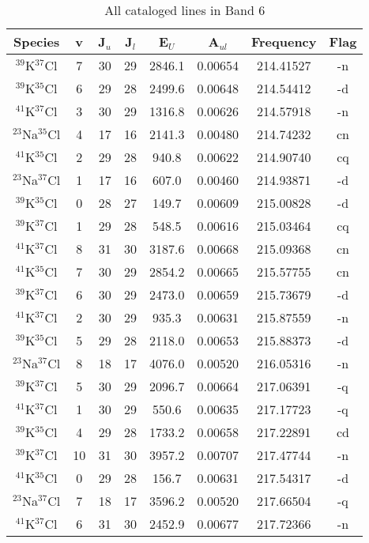 \begin{table*}[htp]
\centering
\caption{All cataloged lines in Band 6}
\begin{tabular}{cccccccc}
\label{tab:all_detections_B6}
Species & v & J$_u$ & J$_l$ & E$_U$ & A$_{ul}$ & Frequency & Flag \\
\hline
$^{39}$K$^{37}$Cl & 7 & 30 & 29 & 2846.1 & 0.00654 & 214.41527 & -n \\
$^{39}$K$^{35}$Cl & 6 & 29 & 28 & 2499.6 & 0.00648 & 214.54412 & -d \\
$^{41}$K$^{37}$Cl & 3 & 30 & 29 & 1316.8 & 0.00626 & 214.57918 & -n \\
$^{23}$Na$^{35}$Cl & 4 & 17 & 16 & 2141.3 & 0.00480 & 214.74232 & cn \\
$^{41}$K$^{35}$Cl & 2 & 29 & 28 & 940.8 & 0.00622 & 214.90740 & cq \\
$^{23}$Na$^{37}$Cl & 1 & 17 & 16 & 607.0 & 0.00460 & 214.93871 & -d \\
$^{39}$K$^{35}$Cl & 0 & 28 & 27 & 149.7 & 0.00609 & 215.00828 & -d \\
$^{39}$K$^{37}$Cl & 1 & 29 & 28 & 548.5 & 0.00616 & 215.03464 & cq \\
$^{41}$K$^{37}$Cl & 8 & 31 & 30 & 3187.6 & 0.00668 & 215.09368 & cn \\
$^{41}$K$^{35}$Cl & 7 & 30 & 29 & 2854.2 & 0.00665 & 215.57755 & cn \\
$^{39}$K$^{37}$Cl & 6 & 30 & 29 & 2473.0 & 0.00659 & 215.73679 & -d \\
$^{41}$K$^{37}$Cl & 2 & 30 & 29 & 935.3 & 0.00631 & 215.87559 & -n \\
$^{39}$K$^{35}$Cl & 5 & 29 & 28 & 2118.0 & 0.00653 & 215.88373 & -d \\
$^{23}$Na$^{37}$Cl & 8 & 18 & 17 & 4076.0 & 0.00520 & 216.05316 & -n \\
$^{39}$K$^{37}$Cl & 5 & 30 & 29 & 2096.7 & 0.00664 & 217.06391 & -q \\
$^{41}$K$^{37}$Cl & 1 & 30 & 29 & 550.6 & 0.00635 & 217.17723 & -q \\
$^{39}$K$^{35}$Cl & 4 & 29 & 28 & 1733.2 & 0.00658 & 217.22891 & cd \\
$^{39}$K$^{37}$Cl & 10 & 31 & 30 & 3957.2 & 0.00707 & 217.47744 & -n \\
$^{41}$K$^{35}$Cl & 0 & 29 & 28 & 156.7 & 0.00631 & 217.54317 & -d \\
$^{23}$Na$^{37}$Cl & 7 & 18 & 17 & 3596.2 & 0.00520 & 217.66504 & -q \\
$^{41}$K$^{37}$Cl & 6 & 31 & 30 & 2452.9 & 0.00677 & 217.72366 & -n \\

\end{tabular}
\end{table*}
